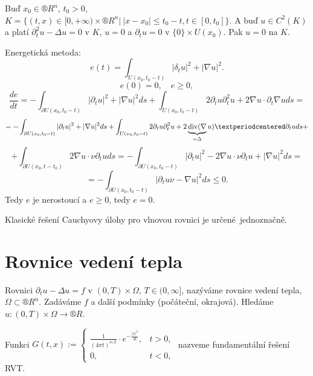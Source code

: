 \documentclass[12pt]{article}					%
\begin{document}

\begin{veta}
	Buď $x_0 \in ®R^n$, $t_0 > 0$, $K = \{(t, x) \in [0, +∞) \times ®R^n |\ |x - x_0| ≤ t_0 - t, t \in [0, t_0]\}$. A buď $u \in C^2(K)$ a platí $\partial_t^2 u - \Delta u = 0$ v $K$, $u = 0$ a $\partial_t u = 0$ v $\{0\} \times U(x_0)$. Pak $u = 0$ na $K$.

	\begin{dukazin}
		Energetická metoda:
		$$ e(t) = \int_{U(x_0, t_0 - t)} |\delta_t u|^2 + |\nabla u|^2. $$
		$$ e(0) = 0, \quad e ≥ 0, $$
		$$ \frac{de}{dt} = - \int_{\partial U(x_0, t_0 - t)}|\partial_t u|^2 + |\nabla u|^2 ds + \int_{U(x_0, t_0 - t)} 2 \partial_t u \partial_t^2 u + 2 \nabla u · \partial_t \nabla u ds = $$
		$$ = - \int_{\partial U(x_0, t_0 - t)}|\partial_t u|^2 + |\nabla u|^2 ds + \int_{U(x_0, t_0 - t)} 2 \partial_t u \partial_t^2 u + 2 \underbrace{\Div(\nabla}_{=\Delta} u) · \partial_t u ds + $$
		$$ + \int_{\partial U(x_0, t - t_0)} 2 \nabla u·\nu \partial_t u ds = - \int_{\partial U(x_0, t_0 - t)}|\partial_t u|^2 - 2\nabla u · \nu \partial_t u + |\nabla u|^2 ds = $$
		$$ = - \int_{\partial U(x_0, t_0 - t)}|\partial_t u \nu - \nabla u|^2 ds ≤ 0. $$
		Tedy $e$ je nerostoucí a $e ≥ 0$, tedy $e = 0$.
	\end{dukazin}
\end{veta}

\begin{dusledek}
	Klasické řešení Cauchyovy úlohy pro vlnovou rovnici je určené jednoznačně.
\end{dusledek}

\section{Rovnice vedení tepla}
\begin{definice}
	Rovnici $\partial_t u - \Delta u = f$ v $(0, T) \times \Omega$, $T \in (0, ∞]$, nazýváme rovnice vedení tepla, $\Omega \subset ®R^n$. Zadáváme $f$ a další podmínky (počáteční, okrajová). Hledáme $u: (0, T) \times \Omega \rightarrow ®R$.
\end{definice}

\begin{definice}
	Funkci $G(t, x) := \begin{cases}\frac{1}{(4\pi t)^{n / 2}}·e^{-\frac{|x|^2}{4t}}, & t > 0,\\0, & t < 0,\end{cases}$ nazveme fundamentální řešení RVT.
\end{definice}
\end{document}
